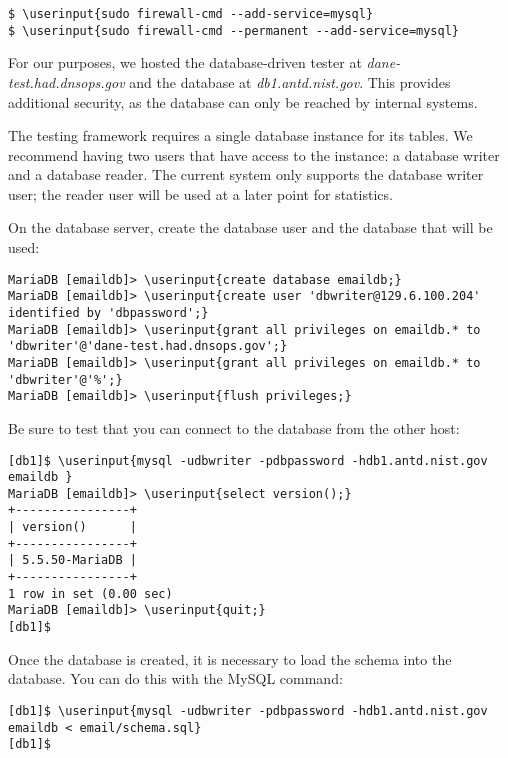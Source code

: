 \documentclass[preprint,3p,11pt]{elsarticle}
\newcommand\userinput[1]{\textbf{#1}}
\begin{document}
\begin{Verbatim}[commandchars=\\\{\},fontsize=\small]
$ \userinput{sudo firewall-cmd --add-service=mysql}
$ \userinput{sudo firewall-cmd --permanent --add-service=mysql}
\end{Verbatim}

For our purposes, we hosted the database-driven tester at
\emph{dane-test.had.dnsops.gov} and the database at
\emph{db1.antd.nist.gov}. This provides additional security, as the
database can only be reached by internal systems.

The testing framework requires a single database instance for its
tables. We recommend having two users that have access to the
instance: a database writer and a database reader. The current system
only supports the database writer user; the reader user will be used
at a later point for statistics.

On the database server, create the database user and the database that
will be used:

\begin{Verbatim}[commandchars=\\\{\},fontsize=\small]
MariaDB [emaildb]> \userinput{create database emaildb;}
MariaDB [emaildb]> \userinput{create user 'dbwriter@129.6.100.204' identified by 'dbpassword';}
MariaDB [emaildb]> \userinput{grant all privileges on emaildb.* to 'dbwriter'@'dane-test.had.dnsops.gov';}
MariaDB [emaildb]> \userinput{grant all privileges on emaildb.* to 'dbwriter'@'%';}
MariaDB [emaildb]> \userinput{flush privileges;}
\end{Verbatim}

Be sure to test that you can connect to the database from the other host:

\begin{Verbatim}[commandchars=\\\{\},fontsize=\small]
[db1]$ \userinput{mysql -udbwriter -pdbpassword -hdb1.antd.nist.gov emaildb }
MariaDB [emaildb]> \userinput{select version();}
+----------------+
| version()      |
+----------------+
| 5.5.50-MariaDB |
+----------------+
1 row in set (0.00 sec)
MariaDB [emaildb]> \userinput{quit;}
[db1]$ 
\end{Verbatim}

Once the database is created, it is necessary to load the schema into
the database. You can do this with the MySQL command:

\begin{Verbatim}[commandchars=\\\{\},fontsize=\small]
[db1]$ \userinput{mysql -udbwriter -pdbpassword -hdb1.antd.nist.gov emaildb < email/schema.sql}
[db1]$
\end{Verbatim}
\end{document}
